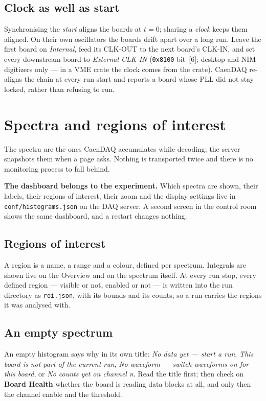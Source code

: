 \documentclass[11pt,a4paper]{report}
\newcommand{\cmd}[1]{\texttt{#1}}
\newcommand{\ui}[1]{\textbf{#1}}          %
\newcommand{\file}[1]{\texttt{#1}}
\begin{document}
\section{Clock as well as start}

Synchronising the \emph{start} aligns the boards at $t=0$; sharing a \emph{clock}
keeps them aligned. On their own oscillators the boards drift apart over a long
run. Leave the first board on \emph{Internal}, feed its CLK-OUT to the next
board's CLK-IN, and set every downstream board to \emph{External CLK-IN}
(\cmd{0x8100} bit~[6]; desktop and NIM digitizers only --- in a VME crate the
clock comes from the crate). CaenDAQ re-aligns the chain at every run start and
reports a board whose PLL did not stay locked, rather than refusing to run.

\chapter{Spectra and regions of interest}
\label{ch:spectra}

The spectra are the ones CaenDAQ accumulates while decoding; the server snapshots
them when a page asks. Nothing is transported twice and there is no monitoring
process to fall behind.

\textbf{The dashboard belongs to the experiment.} Which spectra are shown, their
labels, their regions of interest, their zoom and the display settings live in
\file{conf/histograms.json} on the DAQ server. A second screen in the control room
shows the same dashboard, and a restart changes nothing.

\section{Regions of interest}

A region is a name, a range and a colour, defined per spectrum. Integrals are
shown live on the Overview and on the spectrum itself. At every run stop, every
defined region --- visible or not, enabled or not --- is written into the run
directory as \file{roi.json}, with its bounds and its counts, so a run carries the
regions it was analysed with.

\section{An empty spectrum}

An empty histogram says why in its own title: \emph{No data yet --- start a run},
\emph{This board is not part of the current run}, \emph{No waveform --- switch
waveforms on for this board}, or \emph{No counts yet on channel n}. Read the title
first; then check on \ui{Board Health} whether the board is reading data blocks at
all, and only then the channel enable and the threshold.
\end{document}
